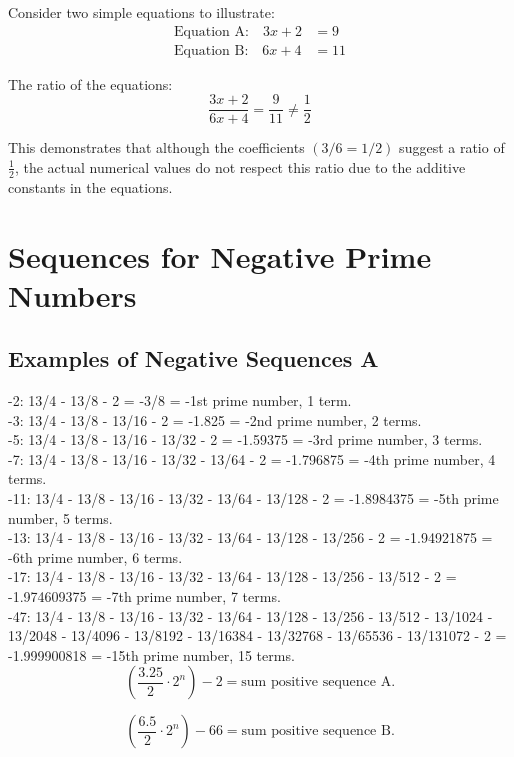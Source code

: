 \documentclass[a4paper,11pt]{article}
\begin{document}
Consider two simple equations to illustrate:
\begin{align}
\text{Equation A:} \quad 3x + 2 &= 9 \\
\text{Equation B:} \quad 6x + 4 &= 11
\end{align}

The ratio of the equations:
\[
\frac{3x + 2}{6x + 4} = \frac{9}{11} \neq \frac{1}{2}
\]

This demonstrates that although the coefficients $(3/6 = 1/2)$ suggest a ratio of $\frac{1}{2}$, the actual numerical values do not respect this ratio due to the additive constants in the equations.

\section*{Sequences for Negative Prime Numbers}

\subsection*{Examples of Negative Sequences A}

-2: 13/4 - 13/8 - 2 = -3/8 = -1st prime number, 1 term.\\
-3: 13/4 - 13/8 - 13/16 - 2 = -1.825 = -2nd prime number, 2 terms.\\
-5: 13/4 - 13/8 - 13/16 - 13/32 - 2 = -1.59375 = -3rd prime number, 3 terms.\\
-7: 13/4 - 13/8 - 13/16 - 13/32 - 13/64 - 2 = -1.796875 = -4th prime number, 4 terms.\\
-11: 13/4 - 13/8 - 13/16 - 13/32 - 13/64 - 13/128 - 2 = -1.8984375 = -5th prime number, 5 terms.\\
-13: 13/4 - 13/8 - 13/16 - 13/32 - 13/64 - 13/128 - 13/256 - 2 = -1.94921875 = -6th prime number, 6 terms.\\
-17: 13/4 - 13/8 - 13/16 - 13/32 - 13/64 - 13/128 - 13/256 - 13/512 - 2 = -1.974609375 = -7th prime number, 7 terms.\\

-47: 13/4 - 13/8 - 13/16 - 13/32 - 13/64 - 13/128 - 13/256 - 13/512 - 13/1024 - 13/2048 - 13/4096 - 13/8192 - 13/16384 - 13/32768 - 13/65536 - 13/131072 - 2 = -1.999900818 = -15th prime number, 15 terms.\\

\[
\left(\frac{3.25}{2} \cdot 2^{n}\right) - 2 = \text{sum positive sequence A.}
\]

\[
\left(\frac{6.5}{2} \cdot 2^{n}\right) - 66 = \text{sum positive sequence B.}
\]
\end{document}
